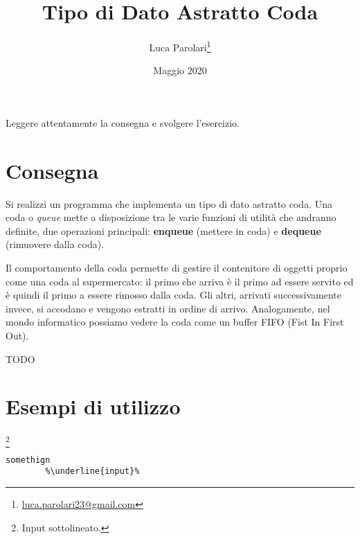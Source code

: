 \documentclass[addpoints,12pt,answers]{exam}
\author{Luca Parolari\footnote{\href{mailto:luca.parolari23@gmail.com}{luca.parolari23@gmail.com}}}
\begin{document}
    
    \title{Tipo di Dato Astratto Coda}
    \date{Maggio 2020}
    
    \maketitle
    
    Leggere attentamente la consegna e svolgere l'esercizio.
    
    \section{Consegna}
    Si realizzi un programma che implementa un tipo di dato astratto coda. Una coda o \emph{queue} mette a disposizione tra le varie funzioni di utilità che andranno definite, due operazioni principali: \textbf{enqueue} (mettere in coda) e \textbf{dequeue} (rimuovere dalla coda).

    Il comportamento della coda permette di gestire il contenitore di oggetti proprio come una coda al supermercato: il primo che arriva è il primo ad essere servito ed è quindi il primo a essere rimosso dalla coda. Gli altri, arrivati successivamente invece, si accodano e vengono estratti in ordine di arrivo. Analogamente, nel mondo informatico possiamo vedere la coda come un buffer FIFO (Fist In First Out).

    TODO

    
    \section{Esempi di utilizzo}
    \footnote{Input sottolineato.}
    
	\begin{lstlisting}[style=verbatim]
		somethign
		%\underline{input}%
	\end{lstlisting}
    
\end{document}
